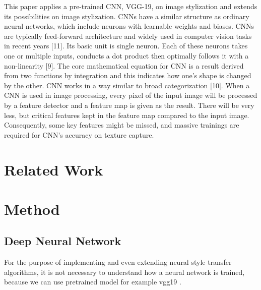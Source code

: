 \documentclass[runningheads]{llncs}
\begin{document}
This paper applies a pre-trained CNN, VGG-19, on image stylization and extends its possibilities on image stylization. CNNs have a similar structure as ordinary neural networks, which include neurons with learnable weights and biases. CNNs are typically feed-forward architecture and widely used in computer vision tasks in recent years [11]. Its basic unit is single neuron. Each of these neurons takes one or multiple inputs, conducts a dot product then optimally follows it with a non-linearity [9]. The core mathematical equation for CNN is a result derived from two functions by integration and this indicates how one’s shape is changed by the other. CNN works in a way similar to broad categorization [10]. When a CNN is used in image processing, every pixel of the input image will be processed by a feature detector and a feature map is given as the result. There will be very less, but critical features kept in the feature map compared to the input image. Consequently, some key features might be missed, and massive trainings are required for CNN’s accuracy on texture capture. 

\section{Related Work}



\section{Method}

\subsection{Deep Neural Network}

For the purpose of implementing and even extending neural style transfer algorithms,
it is not necessary to understand how a neural network is trained, because
we can use pretrained model for example vgg19 \cite{vgg19}.
\end{document}
